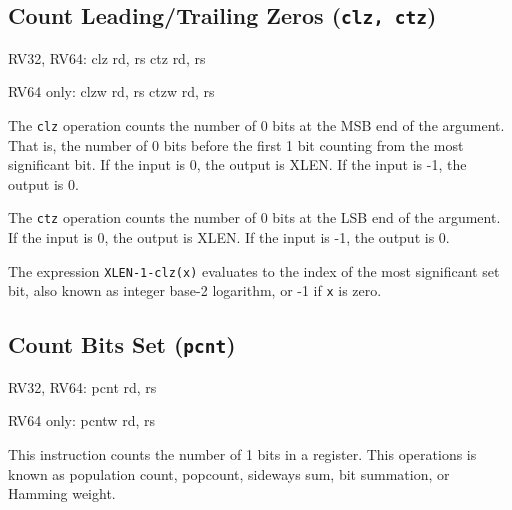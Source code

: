 
\subsection{Count Leading/Trailing Zeros (\texttt{clz, ctz})}

\begin{rvb}
  RV32, RV64:
    clz rd, rs
    ctz rd, rs

  RV64 only:
    clzw rd, rs
    ctzw rd, rs
\end{rvb}

The {\tt clz} operation counts the number of 0 bits at the MSB end of the
argument.  That is, the number of 0 bits before the first 1 bit counting from
the most significant bit. If the input is 0, the output is XLEN. If the input
is -1, the output is 0.

The {\tt ctz} operation counts the number of 0 bits at the LSB end of the
argument. If the input is 0, the output is XLEN. If the input is -1, the
output is 0.



The expression {\tt XLEN-1-clz(x)} evaluates to the index of the most significant
set bit, also known as integer base-2 logarithm, or -1 if {\tt x} is zero.

%
%


\subsection{Count Bits Set (\texttt{pcnt})}

\begin{rvb}
  RV32, RV64:
    pcnt rd, rs

  RV64 only:
    pcntw rd, rs
\end{rvb}

This instruction counts the number of 1 bits in a register. This operations is known as
population count, popcount, sideways sum, bit summation, or Hamming weight.~\cite{HammingWeight,Warren12}

